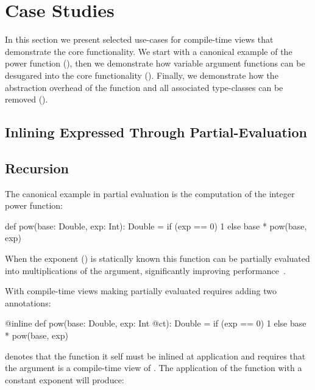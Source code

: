 \section{Case Studies}
\label{sct:case-studies}

In this section we present selected use-cases for compile-time views that demonstrate
 the core functionality. We start with a canonical example of the power function
 (), then we demonstrate how variable argument functions can be
 desugared into the core functionality (). Finally, we demonstrate how
 the abstraction overhead of the  function and all associated type-classes
 can be removed ().

\subsection{Inlining Expressed Through Partial-Evaluation}
\label{sct:inlining}

\subsection{Recursion}
\label{sct:recursion}

The canonical example in partial evaluation is the computation of the integer power
 function:

\begin{lstparagraph}
def pow(base: Double, exp: Int): Double =
  if (exp == 0) 1 else base * pow(base, exp)
\end{lstparagraph}

When the exponent () is statically known this function can be partially
evaluated into  multiplications of the  argument, significantly
improving performance~\cite{}.


With compile-time views making partially evaluated requires adding two annotations:

\begin{lstparagraph}
@inline def pow(base: Double, exp: Int @ct): Double =
  if (exp == 0) 1 else base * pow(base, exp)
\end{lstparagraph}

 denotes that the  function it self must be inlined at application
 and  requires that the  argument is a compile-time view of .
 The application of the function  with a constant exponent will produce:

